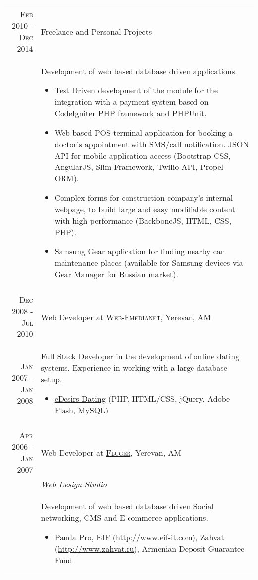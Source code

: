 \documentclass[a4paper,10pt]{article}
\begin{document}
\begin{tabular}{r|p{11cm}}
\multicolumn{2}{c}{} \\


\textsc{Feb 2010 - Dec 2014}
  & Freelance and Personal Projects \\

& \footnotesize{ Development of web based database driven applications.
  \begin{itemize}
    \item Test Driven development of the module for the integration with a
          payment system based on CodeIgniter PHP framework and PHPUnit.
    \item Web based POS terminal application for booking a doctor's appointment
          with SMS/call notification. JSON API for mobile application access
          (Bootstrap CSS, AngularJS, Slim Framework, Twilio API, Propel ORM).
    \item Complex forms for construction company's internal webpage, to
          build large and easy modifiable content with high performance
          (BackboneJS, HTML, CSS, PHP).
    \item Samsung Gear application for finding nearby car maintenance places
          (available for Samsung devices via Gear Manager for Russian market).
  \end{itemize}
} \\


\multicolumn{2}{c}{} \\


\textsc{Dec 2008 - Jul 2010}
    & Web Developer at
      \textsc{\href{http://web-emedianet.com/}{Web-Emedianet}}, Yerevan, AM \\
  \textsc{Jan 2007 - Jan 2008}
    & \footnotesize{ Full Stack Developer in the development of online dating
      systems. Experience in working with a large database setup.
  \begin{itemize}
    \item \href{http://www.edesirs.com/}{eDesirs Dating}
    (PHP, HTML/CSS, jQuery, Adobe Flash, MySQL)
  \end{itemize}
} \\


\multicolumn{2}{c}{} \\


\textsc{Apr 2006 - Jan 2007}
  & Web Developer at \textsc{\href{http://www.fluger.com}{Fluger}},
    Yerevan, AM \\
  & \emph{Web Design Studio} \\
  & \footnotesize{ Development of web based database driven Social networking,
    CMS and E-commerce applications.
    \begin{itemize}
      \item Panda Pro,
        EIF (\href{http://www.eif-it.com}{http://www.eif-it.com}),
        Zahvat (\href{http://www.zahvat.ru}{http://www.zahvat.ru}),
        Armenian Deposit Guarantee Fund
    \end{itemize}
}\\



\end{tabular}
\end{document}
